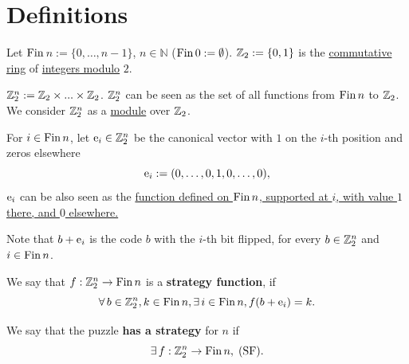 \section{Definitions}

\bigskip


Let \href{https://leanprover-community.github.io/mathlib4_docs/Init/Prelude.html#Fin}{$\mathrm{Fin}\,$}$ n :=\{0,\ldots,n-1\}$, $n\in\mathbb{N}$
($\mathrm{Fin}\, 0 := \emptyset$). $\mathbb{Z}_2 := \{0,1\}$ is the \href{https://leanprover-community.github.io/mathlib4_docs/Mathlib/Algebra/Ring/Defs.html#CommRing}{commutative ring} of \href{https://leanprover-community.github.io/mathlib4_docs/Mathlib/Data/ZMod/Defs.html#ZMod}{integers modulo} $2$.


\medskip

\begin{definition}
\label{def:Z2n}
\leanok
$\mathbb{Z}_2^n := \mathbb{Z}_2\times...\times\mathbb{Z}_2$. $\mathbb{Z}_2^n$ can be seen as the set of all functions from $\mathrm{Fin}\, n$ to $\mathbb{Z}_2$. We consider $\mathbb{Z}_2^n$ as a \href{https://leanprover-community.github.io/mathlib4_docs/Mathlib/Algebra/Module/Defs.html#Module}{module} over $\mathbb{Z}_2$.
\end{definition}

\medskip

\begin{definition}
\label{def:e}
\leanok
{}
For $i\in \mathrm{Fin}\, n$, let ${\rm e}_i\in\mathbb{Z}_2^n$ be the canonical vector with
$1$ on the $i$-th position and zeros elsewhere
\renewcommand{\theequation}{e}
\begin{equation}
\label{e}
{\rm e}_i := (0,\ldots,0,1,0,\ldots,0),
\end{equation}
\renewcommand{\theequation}{\arabic{equation}}
${\rm e}_i$ can be also seen as the \href{https://leanprover-community.github.io/mathlib4_docs/Mathlib/Algebra/Notation/Pi/Basic.html#Pi.single}{function defined on $\mathrm{Fin}\, n$,
supported at $i$, with value $1$ there, and $0$ elsewhere.}


Note that $b+{\rm e}_i$ is the code $b$ with the $i$-th bit flipped,
for every $b\in\mathbb{Z}_2^n$ and $i\in \mathrm{Fin}\, n$.
\end{definition}

\medskip

\begin{definition}
\label{def:SF}
\leanok
{}
We say that $f:\mathbb{Z}_2^n \to \mathrm{Fin}\, n$ is a {\bf strategy function}, if
\renewcommand{\theequation}{SF}
\begin{equation}
\label{SF}
\forall\, b\in\mathbb{Z}_2^n, k\in\mathrm{Fin}\, n, \exists\, i \in \mathrm{Fin}\, n, f(b+{\rm e}_i) = k.
\end{equation}
\renewcommand{\theequation}{\arabic{equation}}

We say that the puzzle {\bf has a strategy} for $n$ if
$$\exists\, f: \mathbb{Z}_2^n \to \mathrm{Fin}\, n, \; \text{(SF)}.$$
\end{definition}

